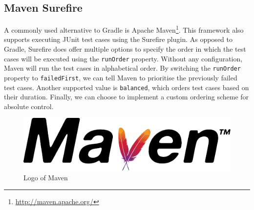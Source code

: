 
\subsection{Maven Surefire}
A commonly used alternative to Gradle is Apache Maven\footnote{\url{http://maven.apache.org/}}. This framework also supports executing JUnit test cases using the Surefire plugin. As opposed to Gradle, Surefire does offer multiple options to specify the order in which the test cases will be executed using the \texttt{runOrder} property. Without any configuration, Maven will run the test cases in alphabetical order. By switching the \texttt{runOrder} property to \texttt{failedFirst}, we can tell Maven to prioritise the previously failed test cases. Another supported value is \texttt{balanced}, which orders test cases based on their duration. Finally, we can choose to implement a custom ordering scheme for absolute control.

\begin{figure}[htbp!]
	\centering
	\includegraphics[height=0.05\textheight]{assets/images/maven.pdf}
	\caption{Logo of Maven}
\end{figure}